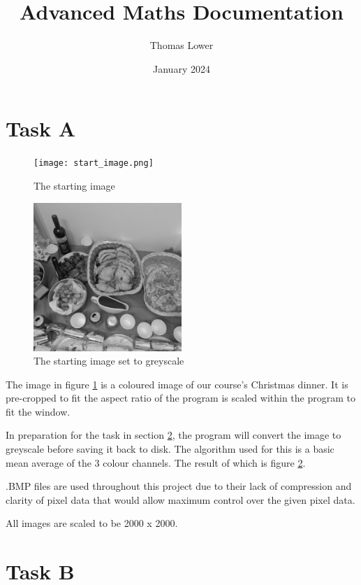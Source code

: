 \documentclass{article}
\title{Advanced Maths Documentation}
\author{Thomas Lower}
\date{January 2024}
\begin{document}
\maketitle

\pagebreak

\section{Task A} \label{a}

\begin{figure}[h]
    \centering
    \caption{The starting image}
    \label{fig:start}
    \texttt{[image: start\_image.png]}
\end{figure}

\begin{figure}[h]
    \centering
    \caption{The starting image set to greyscale}
    \label{fig:greyscale}
    \includegraphics[width=0.5\textwidth]{grayscale_image.png}
\end{figure}

The image in figure \ref{fig:start} is a coloured image of our course's Christmas dinner. It is pre-cropped to fit the aspect ratio of the program is scaled within the program to fit the window.

In preparation for the task in section \ref{b}, the program will convert the image to greyscale before saving it back to disk. The algorithm used for this is a basic mean average of the 3 colour channels. The result of which is figure \ref{fig:greyscale}.

.BMP files are used throughout this project due to their lack of compression and clarity of pixel data that would allow maximum control over the given pixel data.

All images are scaled to be 2000 x 2000.

\section{Task B} \label{b}
\end{document}
